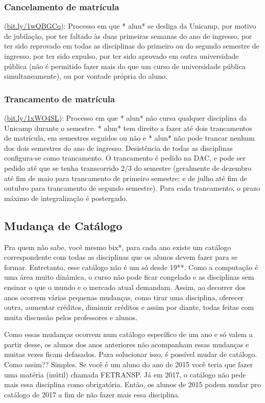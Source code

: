 \subsubsection{Cancelamento de matrícula} (\url{bit.ly/1wQBGCq}):
Processo em que * alun* se desliga da Unicamp, por motivo de jubilação, por ter
faltado às duas primeiras semanas do ano de ingresso, por ter sido reprovado em
todas as disciplinas do primeiro ou do segundo semestre de ingresso, por ter
sido expulso, por ter sido aprovado em outra universidade pública (não é
permitido fazer mais do que um curso de universidade pública simultaneamente),
ou por vontade própria do aluno.
\subsubsection{Trancamento de matrícula} (\url{bit.ly/1xWO4SL}): Processo
em que * alun* não cursa qualquer disciplina da Unicamp durante o semestre. *
alun* tem direito a fazer até dois trancamentos de matrícula, em semestres
seguidos ou não e * alun* não pode trancar nenhum dos dois semestres do ano de
ingresso. Desistência de todas as disciplinas configura-se como trancamento. O
trancamento é pedido na DAC, e pode ser pedido até que se tenha transcorrido 2/3
do semestre (geralmente de dezembro até fim de maio para trancamento de primeiro
semestre; e de julho até fim de outubro para trancamento de segundo
semestre). Para cada trancamento, o prazo máximo de integralização é postergado.

\subsection{Mudança de Catálogo}

Pra quem não sabe, você mesmo bix*, para cada ano existe um catálogo correspondente
com todas as disciplinas que os alunos devem fazer para se formar. Entretanto, esse
catálogo não é um só desde 19**. Como a computação é uma área muito dinâmica, o
curso não pode ficar congelado e as disciplinas sem ensinar o que o mundo e o 
mercado atual demandam. Assim, ao decorrer dos anos ocorrem várias pequenas mudanças,
como tirar uma disciplina, oferecer outra, aumentar créditos, diminuir créditos e
assim por diante, todas feitas com muita discussão pelos professores e alunos. 

Como essas mudanças ocorrem num catálogo específico de um ano e só valem a partir
desse, os alunos dos anos anteriores não acompanham essas mudanças e muitas vezes
ficam defasados. Para solucionar isso, é possível mudar de catálogo.
Como assim?? Simples. Se você é um aluno do ano de 2015 você teria que fazer uma 
matéria (inútil) chamada FETRANSP. Já em 2017, o catálogo não pede mais essa 
disciplina como obrigatória. Então, os alunos de 2015 podem mudar pro catálogo de
2017 a fim de não fazer mais essa disciplina. 

